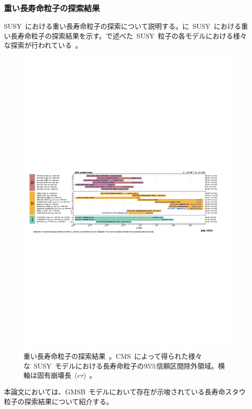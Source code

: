 \subsubsection{重い長寿命粒子の探索結果}
SUSY~における重い長寿命粒子の探索について説明する。に~SUSY~における重い長寿命粒子の探索結果を示す。で述べた~SUSY~粒子の各モデルにおける様々な探索が行われている~\cite{AR:13a,AR:13b,AR:13c,AR:13d}。
\begin{figure}[H]
        \centering   
        \includegraphics[width=\textwidth,page=1]{img/pdf/susy2.pdf}
        \caption[重い長寿命粒子の探索結果]{重い長寿命粒子の探索結果~\cite{AR:13a,AR:13b,AR:13c,AR:13d}。CMS~によって得られた様々な~SUSY~モデルにおける長寿命粒子の$95\%$信頼区間除外領域。横軸は固有崩壊長~($c\tau$)~。}\label{fig:susy2}
\end{figure}

本論文においては、GMSB~モデルにおいて存在が示唆されている長寿命スタウ粒子の探索結果について紹介する。

